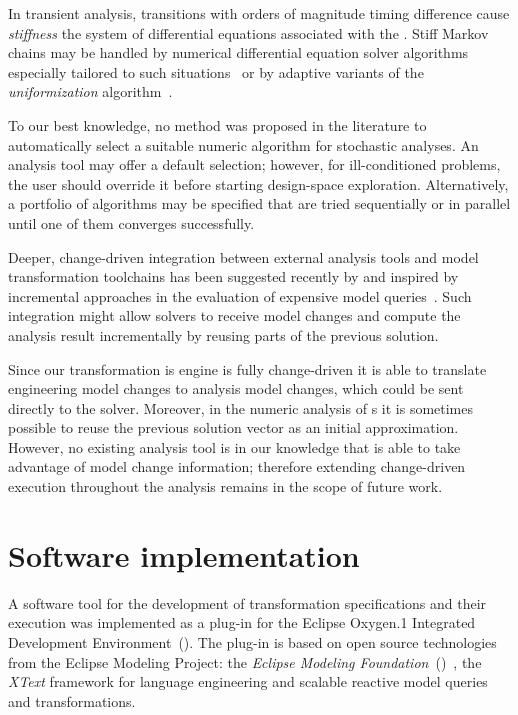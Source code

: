 In transient analysis, transitions with orders of magnitude timing difference cause \emph{stiffness} the system of differential equations associated with the . Stiff Markov chains may be handled by numerical differential equation solver algorithms especially tailored to such situations~\citep{Reibman89transient} or by adaptive variants of the \emph{uniformization} algorithm~\citep{Moorsel97uniformization,Dijk17uniformization}.

To our best knowledge, no method was proposed in the literature to automatically select a suitable numeric algorithm for stochastic analyses. An analysis tool may offer a default selection; however, for ill-conditioned problems, the user should override it before starting design-space exploration. Alternatively, a portfolio of algorithms may be specified that are tried sequentially or in parallel until one of them converges successfully.

\begin{remark}
  Deeper, change-driven integration between external analysis tools and model transformation toolchains has been suggested recently by \citet{Molnar16componentwise} and \citet[Section~2.8]{Meyers16thesis} inspired by incremental approaches in the evaluation of expensive model queries~\citep{Ujhelyi15incquery}. Such integration might allow solvers to receive model changes and compute the analysis result incrementally by reusing parts of the previous solution.
  
  Since our  transformation is engine is fully change-driven it is able to translate engineering model changes to analysis model changes, which could be sent directly to the solver. Moreover, in the numeric analysis of s it is sometimes possible to reuse the previous solution vector as an initial approximation. However, no existing analysis tool is in our knowledge that is able to take advantage of model change information; therefore extending change-driven execution throughout the analysis remains in the scope of future work.
\end{remark}

\section{Software implementation}

A software tool for the development of transformation specifications and their execution was implemented as a plug-in for the Eclipse Oxygen.1 Integrated Development Environment~(). The plug-in is based on open source technologies from the Eclipse Modeling Project: the \emph{Eclipse Modeling Foundation}~()~\citep{Steinberg09emf}, the \emph{XText} framework for language engineering and \emph{} scalable reactive model queries and transformations.

